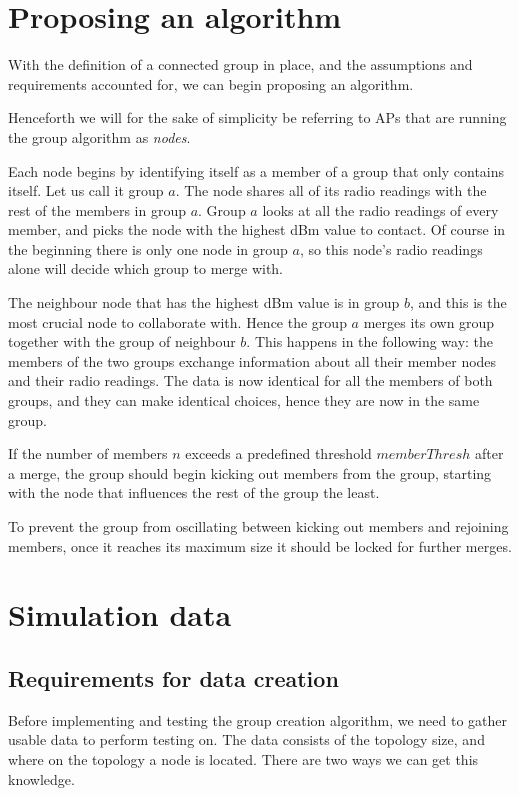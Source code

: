 \documentclass[a4paper,UKenglish]{report}
\begin{document}
\section{Proposing an algorithm}\label{algorithm}
With the definition of a connected group in place, and the assumptions and requirements accounted for, we can begin proposing an algorithm.

Henceforth we will for the sake of simplicity be referring to APs that are running the group algorithm as \textit{nodes}.

Each node begins by identifying itself as a member of a group that only contains itself. Let us call it group $a$. The node shares all of
its radio readings with the rest of the members in group $a$. Group $a$ looks at all the radio readings of every member, and picks the node with the highest dBm value
to contact. Of course in the beginning there is only one node in group $a$, so this node's radio readings alone will decide which group to merge with. 

The neighbour node that has the highest dBm value is in group $b$, and this is the most crucial node to collaborate with. Hence the group $a$ merges its own group together
with the group of neighbour $b$. This happens in the following way: the members of the two groups exchange information about all their member nodes and their radio readings.
The data is now identical for all the members of both groups, and they can make identical choices, hence they are now in the same group. 

If the number of members $n$ exceeds a predefined threshold $memberThresh$ after a merge, the group should begin kicking out members from the group, starting with the node
that influences the rest of the group the least. 

To prevent the group from oscillating between kicking out members and rejoining members, once it reaches
its maximum size it should be locked for further merges. 

\section{Simulation data} \label{simdata}

\subsection{Requirements for data creation}
Before implementing and testing the group creation algorithm, we need to gather usable data to perform testing on.
The data consists of the topology size, and where on the topology a node is located. There are two ways we can get this knowledge.
\end{document}
